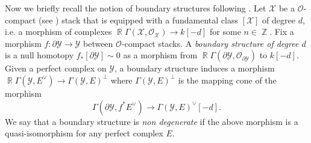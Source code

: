 \documentclass[reqno]{amsart}
\DeclareMathOperator\Z{\mathbb Z}
\DeclareMathOperator\R{\mathbb R}
\theoremstyle{definition}
\theoremstyle{remark}
\newcommand{\cO}{\mathcal{O}}
\newcommand{\sX}{\mathscr{X}}
\newcommand{\sY}{\mathscr{Y}}
\numberwithin{equation}{section}
\begin{document}
Now we briefly recall the notion of boundary structures following \cite[Section 2.2.3]{Ca14}. Let $\sX$ be a $\cO$-compact (see \cite[Definition 2.1]{PTVV}) stack that is equipped with a fundamental class $[\sX]$ of degree $d$, i.e. a morphism of complexes $\R\Gamma(\sX,\cO_\sX)\to k[-d]$ for some $n\in\Z$. 
Fix a morphism $f:\partial\sY\to \sY$ between $\cO$-compact stacks. 
A \emph{boundary structure of degree $d$} is a null homotopy $f_*[\partial\sY]\sim 0$ as a morphism from $\R\Gamma(\partial\sY,\cO_{\partial\sY})$ to $k[-d]$. Given a perfect complex on $\sY$, a boundary structure induces a morphism $\R\Gamma(\sY,E^\vee)\to \Gamma(\sY,E)^\perp$ where $\Gamma(\sY,E)^\perp$ is the mapping cone of the morphism
\[
\Gamma(\partial \sY, f^*E^\vee)\to \Gamma(\sY,E)^\vee[-d].
\]
We say that a boundary structure is \emph{non degenerate} if the above morphism is a quasi-isomorphism for any perfect complex $E$.
\end{document}
